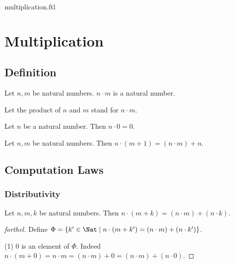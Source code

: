 \documentclass{naproche-library}
\begin{document}
\begin{smodule}{multiplication.ftl}

  \section*{Multiplication}

  \subsection*{Definition}

  \begin{signature}[forthel,id=ARITHMETIC_06_6626346484629504,printid]
    Let $n, m$ be natural numbers.
    $n \cdot m$ is a natural number.

    Let the product of $n$ and $m$ stand for $n \cdot m$.
  \end{signature}

  \begin{axiom}[forthel,id=ARITHMETIC_06_8941041092657152,printid]
    Let $n$ be a natural number.
    Then $n \cdot 0 = 0$.
  \end{axiom}

  \begin{axiom}[forthel,id=ARITHMETIC_06_2211275408932864,printid]
    Let $n, m$ be natural numbers.
    Then $n \cdot (m + 1) = (n \cdot m) + n$.
  \end{axiom}


  \subsection*{Computation Laws}

  \subsubsection*{Distributivity}

  \begin{proposition}[forthel,id=ARITHMETIC_06_9001524774567936,printid]
    Let $n, m, k$ be natural numbers.
    Then $n \cdot (m + k) = (n \cdot m) + (n \cdot k)$.
  \end{proposition}
  \begin{proof}[forthel]
    Define $\Phi = \{ k' \in \Nat \mid n \cdot (m + k') = (n \cdot m) + (n \cdot k') \}$.

    (1) $0$ is an element of $\Phi$.
    Indeed $n \cdot (m + 0)
      = n \cdot m
      = (n \cdot m) + 0
      = (n \cdot m) + (n \cdot 0)$.


\end{proof}
\end{smodule}
\end{document}
